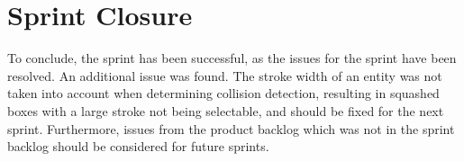 \section{Sprint Closure}
To conclude, the sprint has been successful, as the issues for the sprint have been resolved. 
An additional issue was found. The stroke width of an entity was not taken into account when determining collision detection, resulting in squashed boxes with a large stroke not being selectable, and should be fixed for the next sprint.
Furthermore, issues from the product backlog which was not in the sprint backlog should be considered for future sprints.
